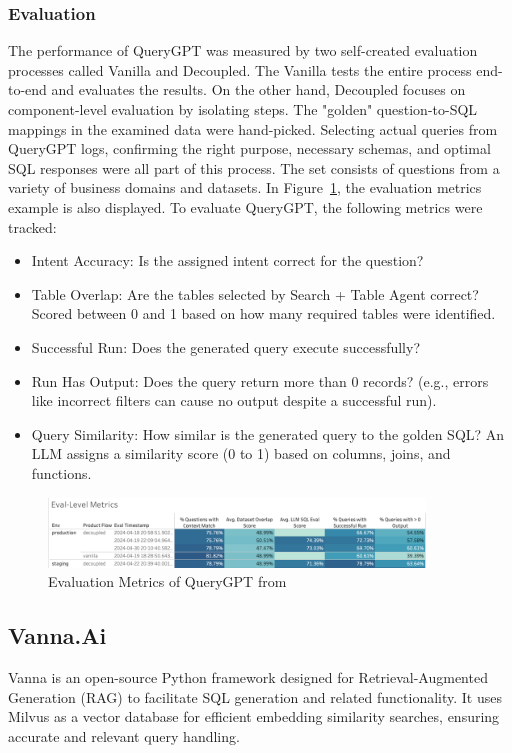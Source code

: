         \subsubsection{Evaluation}
        The performance of QueryGPT was measured by two self-created evaluation processes called Vanilla and Decoupled. The Vanilla tests the entire process end-to-end and evaluates the results. On the other hand, Decoupled focuses on component-level evaluation by isolating steps. The "golden" question-to-SQL mappings in the examined data were hand-picked. Selecting actual queries from QueryGPT logs, confirming the right purpose, necessary schemas, and optimal SQL responses were all part of this process. The set consists of questions from a variety of business domains and datasets. In Figure~\ref{fig:query-gpt-metrics}, the evaluation metrics example is also displayed. 
        To evaluate QueryGPT, the following metrics were tracked:
        \begin{itemize}
            \item  Intent Accuracy: Is the assigned intent correct for the question?
            \item  Table Overlap: Are the tables selected by Search + Table Agent correct? Scored between 0 and 1 based on how many required tables were identified.
            \item  Successful Run: Does the generated query execute successfully?
            \item  Run Has Output: Does the query return more than 0 records? (e.g., errors like incorrect filters can cause no output despite a successful run).
            \item  Query Similarity: How similar is the generated query to the golden SQL? An LLM assigns a similarity score (0 to 1) based on columns, joins, and functions.
        \end{itemize}
        \begin{figure}[H]
            \centering
            \includegraphics[width=10cm]{chapters/2/figures/query-gpt-metrics.png}
            \caption[Evaluation Metrics of QueryGPT]{Evaluation Metrics of QueryGPT  from~\cite{QueryGPT}}
            \label{fig:query-gpt-metrics}
        \end{figure}
    \subsection{Vanna.Ai}
    Vanna is an open-source Python framework designed for Retrieval-Augmented Generation (RAG) to facilitate SQL generation and related functionality. It uses Milvus as a vector database for efficient embedding similarity searches, ensuring accurate and relevant query handling.
    
